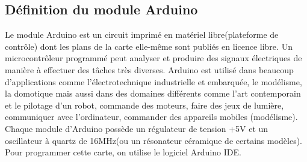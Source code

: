 \documentclass[12pt, openany]{report}
\begin{document}
 \subsection{Définition du module Arduino}
 \large
Le module Arduino est un circuit imprimé en matériel libre(plateforme de contrôle) dont les plans de la carte elle-même sont publiés en
licence libre. Un microcontrôleur programmé peut analyser et produire des signaux électriques de manière à effectuer des tâches très
diverses. Arduino est utilisé dans beaucoup d'applications comme l'électrotechnique industrielle et embarquée, le modélisme, la domotique
mais aussi dans des domaines différents comme l'art contemporain et le pilotage d'un robot, commande des moteurs, faire des jeux de
lumière, communiquer avec l'ordinateur, commander des appareils mobiles (modélisme). Chaque module d'Arduino possède un régulateur de
tension +5V et un oscillateur à quartz de 16MHz(ou un résonateur céramique de certains modèles). Pour programmer cette carte, on utilise
le logiciel Arduino IDE.
\end{document}
